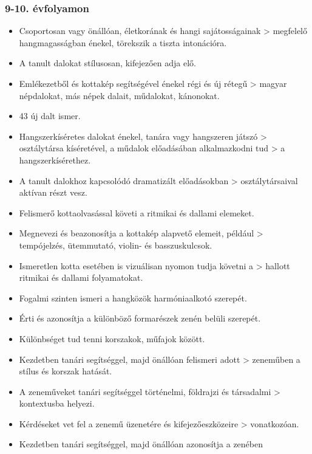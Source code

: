 \hypertarget{evfolyamon-13}{%
\subsubsection{9-10. évfolyamon}\label{evfolyamon-13}}

\begin{itemize}
\item
  Csoportosan vagy önállóan, életkorának és hangi sajátosságainak
  \textgreater{} megfelelő hangmagasságban énekel, törekszik a tiszta
  intonációra.
\item
  A tanult dalokat stílusosan, kifejezően adja elő.
\item
  Emlékezetből és kottakép segítségével énekel régi és új rétegű
  \textgreater{} magyar népdalokat, más népek dalait, műdalokat,
  kánonokat.
\item
  43 új dalt ismer.
\item
  Hangszerkíséretes dalokat énekel, tanára vagy hangszeren játszó
  \textgreater{} osztálytársa kíséretével, a műdalok előadásában
  alkalmazkodni tud \textgreater{} a hangszerkísérethez.
\item
  A tanult dalokhoz kapcsolódó dramatizált előadásokban \textgreater{}
  osztálytársaival aktívan részt vesz.
\item
  Felismerő kottaolvasással követi a ritmikai és dallami elemeket.
\item
  Megnevezi és beazonosítja a kottakép alapvető elemeit, például
  \textgreater{} tempójelzés, ütemmutató, violin- és basszuskulcsok.
\item
  Ismeretlen kotta esetében is vizuálisan nyomon tudja követni a
  \textgreater{} hallott ritmikai és dallami folyamatokat.
\item
  Fogalmi szinten ismeri a hangközök harmóniaalkotó szerepét.
\item
  Érti és azonosítja a különböző formarészek zenén belüli szerepét.
\item
  Különbséget tud tenni korszakok, műfajok között.
\item
  Kezdetben tanári segítséggel, majd önállóan felismeri adott
  \textgreater{} zeneműben a stílus és korszak hatását.
\item
  A zeneműveket tanári segítséggel történelmi, földrajzi és társadalmi
  \textgreater{} kontextusba helyezi.
\item
  Kérdéseket vet fel a zenemű üzenetére és kifejezőeszközeire
  \textgreater{} vonatkozóan.
\item
  Kezdetben tanári segítséggel, majd önállóan azonosítja a zenében

\end{itemize}
